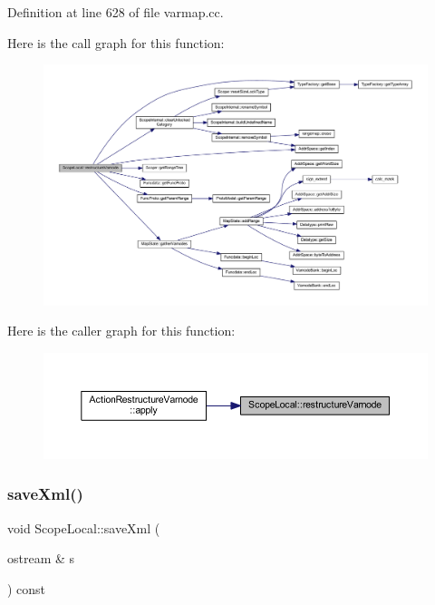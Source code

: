 Definition at line 628 of file varmap.\+cc.

Here is the call graph for this function\+:
\nopagebreak
\begin{figure}[H]
\begin{center}
\leavevmode
\includegraphics[width=350pt]{class_scope_local_a4f0d61de6d043ae92af2c2cf1836453a_cgraph}
\end{center}
\end{figure}
Here is the caller graph for this function\+:
\nopagebreak
\begin{figure}[H]
\begin{center}
\leavevmode
\includegraphics[width=350pt]{class_scope_local_a4f0d61de6d043ae92af2c2cf1836453a_icgraph}
\end{center}
\end{figure}
\mbox{\label{class_scope_local_a5ce828992aceb086c5bcc62d8cf2f3ae}} 
\subsubsection{\texorpdfstring{saveXml()}{saveXml()}}
{\footnotesize\ttfamily void Scope\+Local\+::save\+Xml (\begin{DoxyParamCaption}\item[{ostream \&}]{s }\end{DoxyParamCaption}) const\hspace{0.3cm}{\ttfamily [virtual]}}



